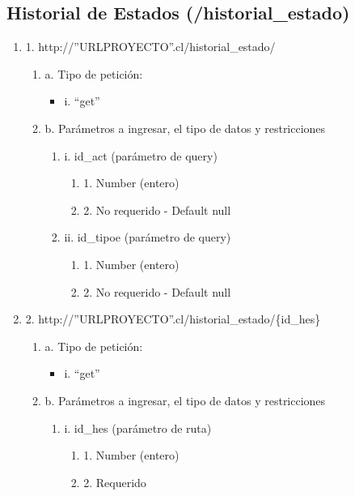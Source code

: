 \subsection{Historial de Estados (/historial\_estado)}

\begin{enumerate}
    \item 1. http://”URLPROYECTO”.cl/historial\_estado/
    \begin{enumerate}
        \item a. Tipo de petición:
            \begin{itemize}
               \item i. “get”
            \end{itemize}
        \item b. Parámetros a ingresar, el tipo de datos y restricciones
            \begin{enumerate}
                \item i. id\_act (parámetro de query)
                    \begin{enumerate}
                        \item 1. Number (entero)
                        \item 2. No requerido - Default null
                    \end{enumerate}
                \item ii. id\_tipoe (parámetro de query)
                    \begin{enumerate}
                        \item 1. Number (entero)
                        \item 2. No requerido - Default null
                    \end{enumerate}
            \end{enumerate}
    \end{enumerate}

    \item 2. http://”URLPROYECTO”.cl/historial\_estado/\{id\_hes\}
    \begin{enumerate}
        \item a. Tipo de petición:
            \begin{itemize}
               \item i. “get”
            \end{itemize}
        \item b. Parámetros a ingresar, el tipo de datos y restricciones
            \begin{enumerate}
                \item i. id\_hes (parámetro de ruta)
                    \begin{enumerate}
                        \item 1. Number (entero)
                        \item 2. Requerido
                    \end{enumerate}
            \end{enumerate}
    \end{enumerate}


\end{enumerate}
